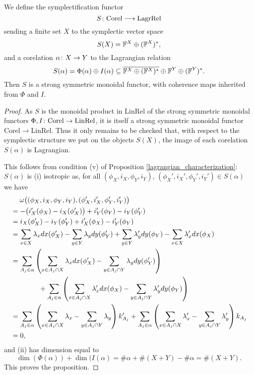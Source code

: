 \begin{proposition} \label{prop:sympfunctor}
  We define the symplectification functor
  \[
    S{\colon} \mathrm{Corel} \longrightarrow \mathrm{LagrRel}
  \]
  sending a finite set $X$ to the symplectic vector space
\[
  S(X) = {\mathbb F}^X \oplus ({\mathbb F}^X)^\ast,
\]
 and a corelation $\alpha{\colon} X \to Y$ to the Lagrangian relation
\[
  S(\alpha) = \Phi(\alpha) \oplus I(\alpha) \subseteq \overline{{\mathbb F}^X \oplus
  ({\mathbb F}^X)^\ast}\oplus {\mathbb F}^Y \oplus ({\mathbb F}^Y)^\ast.
\]
  Then $S$ is a strong symmetric monoidal functor, with coherence maps inherited
  from $\Phi$ and $I$.
\end{proposition}
\begin{proof}
  As $S$ is the monoidal product in $\mathrm{LinRel}$ of the strong symmetric
  monoidal functors $\Phi, I{\colon} \mathrm{Corel} \to \mathrm{LinRel}$, it is
  itself a strong symmetric monoidal functor $\mathrm{Corel} \to
  \mathrm{LinRel}$. Thus it only remains to be checked that, with respect to the
  symplectic structure we put on the objects $S(X)$, the image of each
  corelation $S(\alpha)$ is Lagrangian. 

  This follows from condition (v) of Proposition
  \ref{lagrangian_characterization}: $S(\alpha)$ is (i) isotropic as, for all 
  $(\phi_X,i_X,\phi_Y,i_Y)$, $(\phi_X',i_X',\phi_Y',i_Y') \in S(\alpha)$ we have
  \begin{align*}
    &\phantom{=} \enskip
    \omega\big((\phi_X,i_X,\phi_Y,i_Y),(\phi_X',i_X',\phi_Y',i_Y')\big)
    \\
    &= -\big(i_X'(\phi_X)-i_X(\phi_X')\big) + i_Y'(\phi_Y)-i_Y(\phi_Y') \\
    &= i_X(\phi_X')-i_Y(\phi_Y') + i_X'(\phi_X)-i_Y'(\phi_Y) \\
    &= \sum_{x \in X} \lambda_x dx(\phi_X') - \sum_{y \in Y} \lambda_y dy(\phi_Y') +
    \sum_{y \in Y} \lambda_y' dy(\phi_Y) - \sum_{x \in X} \lambda_x' dx(\phi_X)\\
    &= \sum_{A_j \in \alpha}\left(\sum_{x \in A_j \cap X} \lambda_x dx(\phi_X') -
    \sum_{y \in A_j \cap Y} \lambda_y dy(\phi_Y')\right) \\
    &\qquad \qquad+ \sum_{A_j \in
    \alpha}\left(\sum_{x \in A_j \cap X} \lambda_x'dx(\phi_X) - \sum_{y \in A_j
    \cap Y} \lambda_y' dy(\phi_Y)\right)\\
    &= \sum_{A_j \in \alpha}\left(\sum_{x \in A_j \cap X} \lambda_x - \sum_{y \in
    A_j \cap Y} \lambda_y \right)k'_{A_j} + \sum_{A_j \in \alpha}\left(\sum_{x \in
    A_j \cap X} \lambda_x'- \sum_{y \in A_j \cap Y} \lambda_y'\right)k_{A_j}\\
    &= 0,
  \end{align*}
  and (ii) has dimension equal to 
  \[
    \dim(\Phi(\alpha))+ \dim(I(\alpha) = \#\alpha+\#(X+Y) - \#\alpha= \#(X+Y).
  \]
  This proves the proposition.
\end{proof}

